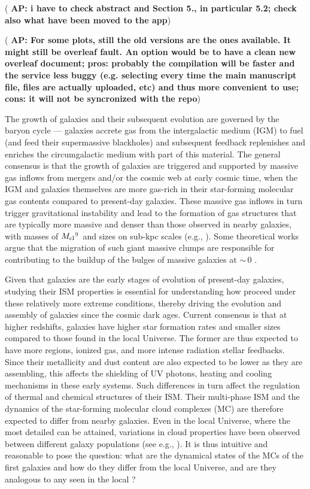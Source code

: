 \IfFileExists{emulateapjlegacy.cls}{\documentclass[iop]{emulateapjlegacy}}{\documentclass[iop]{emulateapj}}
\newcommand{\AP}[1]{({\bf \color{apcolor} AP: #1})}
\begin{document}
\AP{i have to check abstract and Section 5., in particular 5.2; check also what have been moved to the app}

\AP{For some plots, still the old versions are the ones available. It might still be overleaf fault. An option would be to have a clean new overleaf document; pros: probably the compilation will be faster and the service less buggy (e.g. selecting every time the main manuscript file, files are actually uploaded, etc) and thus more convenient to use; cons: it will not be syncronized with the repo}

The growth of galaxies and their subsequent evolution are governed by the baryon cycle --- galaxies accrete gas from the intergalactic medium (IGM) to fuel \SF (and feed their supermassive blackholes) and subsequent feedback replenishes and enriches the circumgalactic medium with part of this material. The general consensus is that the growth of \highz galaxies are triggered and supported by massive gas inflows from mergers and/or the cosmic web at early cosmic time, when the IGM and galaxies themselves are more gas-rich in their star-forming molecular gas contents compared to present-day galaxies.
%
These massive gas inflows in turn trigger gravitational instability and lead
to the formation of gas structures that are typically more massive and denser than those
observed in nearby galaxies, with masses of $M_{\rm cl}$$^9$\,\Msun
and sizes on sub-kpc scales (e.g., \citealt{Gabor13a, Hopkins14a, Inoue16a}).
Some theoretical works argue that the
migration of such giant massive clumps are responsible for contributing to the
buildup of the bulges of massive galaxies at \z$\sim$\,0 \citep[e.g.,][]{Ceverino10a}.

Given that \highz galaxies are the early stages of evolution of present-day galaxies, studying their ISM properties is essential for understanding how \SF proceed under these relatively more extreme conditions, thereby driving the evolution and assembly
of galaxies
since the cosmic dark ages.
Current consensus is that at higher redshifts, galaxies have higher
star formation rates \citep[SFR; ][]{Behroozi13b, Sparre15a, Maiolino15a, Dunlop17a} and
smaller sizes \citep[e.g.,][]{Bouwens11a, Ono13a} compared to those found in the local Universe.
The former are thus expected to have more  regions, ionized gas, and more intense radiation stellar feedbacks.
Since their metallicity and dust content are also expected to be lower as they are assembling,
this affects the shielding of UV photons, heating and cooling mechanisms in these early systems. Such differences in turn
affect the regulation of thermal and chemical structures of their ISM.
Their multi-phase ISM and the dynamics of the star-forming molecular cloud complexes (MC)
are therefore expected to differ from nearby galaxies.
Even in the local Universe, where the most detailed \obs can be attained, variations in cloud properties have been
observed between different galaxy populations (see e.g., \citealt{Hughes10a, Hughes13b}).
It is thus intuitive and reasonable to pose the question: what are the dynamical states of the MCs of the first galaxies and
how do they differ from the local Universe, and are they analogous to any seen in the local \galpop?
%
\end{document}
